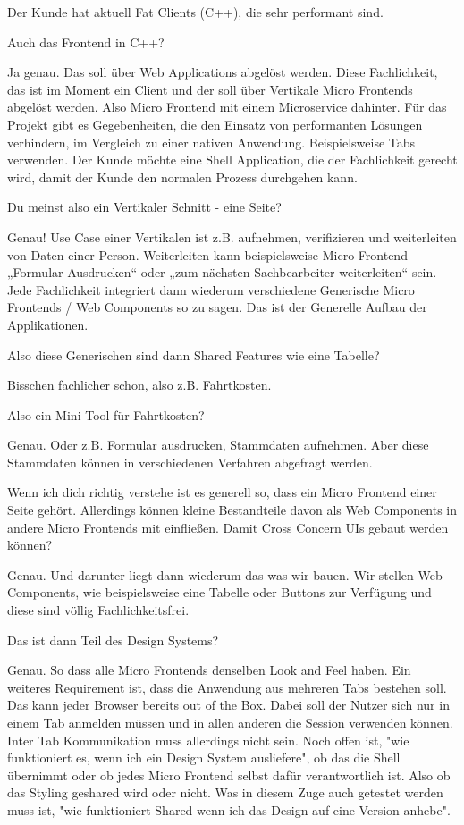 \begin{description}
    \PhilippHuber Der Kunde hat aktuell Fat Clients (C++), die sehr performant sind.

    \NicoVogel Auch das Frontend in C++?

    \PhilippHuber Ja genau. Das soll über Web Applications abgelöst werden. Diese Fachlichkeit, das ist im Moment ein Client und der soll über Vertikale Micro Frontends abgelöst werden. Also Micro Frontend mit einem Microservice dahinter. Für das Projekt gibt es Gegebenheiten, die den Einsatz von performanten Lösungen verhindern, im Vergleich zu einer nativen Anwendung. Beispielsweise Tabs verwenden.
    Der Kunde möchte eine Shell Application, die der Fachlichkeit gerecht wird, damit der Kunde den normalen Prozess durchgehen kann.

    \NicoVogel Du meinst also ein Vertikaler Schnitt - eine Seite?

    \PhilippHuber Genau! Use Case einer Vertikalen ist z.B. aufnehmen, verifizieren und weiterleiten von Daten einer Person. Weiterleiten kann beispielsweise Micro Frontend „Formular Ausdrucken“ oder „zum nächsten Sachbearbeiter weiterleiten“ sein. Jede Fachlichkeit integriert dann wiederum verschiedene Generische Micro Frontends / Web Components so zu sagen. Das ist der Generelle Aufbau der Applikationen.

    \NicoVogel Also diese Generischen sind dann Shared Features wie eine Tabelle?

    \PhilippHuber Bisschen fachlicher schon, also z.B. Fahrtkosten.

    \NicoVogel Also ein Mini Tool für Fahrtkosten?

    \PhilippHuber Genau. Oder z.B. Formular ausdrucken, Stammdaten aufnehmen. Aber diese Stammdaten können in verschiedenen Verfahren abgefragt werden.

    \NicoVogel Wenn ich dich richtig verstehe ist es generell so, dass ein Micro Frontend einer Seite gehört. Allerdings können kleine Bestandteile davon als Web Components in andere Micro Frontends mit einfließen. Damit Cross Concern UIs gebaut werden können?

    \PhilippHuber Genau. Und darunter liegt dann wiederum das was wir bauen. Wir stellen Web Components, wie beispielsweise eine Tabelle oder Buttons zur Verfügung und diese sind völlig Fachlichkeitsfrei.

    \NicoVogel Das ist dann Teil des Design Systems?

    \PhilippHuber Genau. So dass alle Micro Frontends denselben Look and Feel haben. Ein weiteres Requirement ist, dass die Anwendung aus mehreren Tabs bestehen soll. Das kann jeder Browser bereits out of the Box. Dabei soll der Nutzer sich nur in einem Tab anmelden müssen und in allen anderen die Session verwenden können. Inter Tab Kommunikation muss allerdings nicht sein. Noch offen ist, "wie funktioniert es, wenn ich ein Design System ausliefere", ob das die Shell übernimmt oder ob jedes Micro Frontend selbst dafür verantwortlich ist. Also ob das Styling geshared wird oder nicht. Was in diesem Zuge auch getestet werden muss ist, "wie funktioniert Shared wenn ich das Design auf eine Version anhebe".


\end{description}

